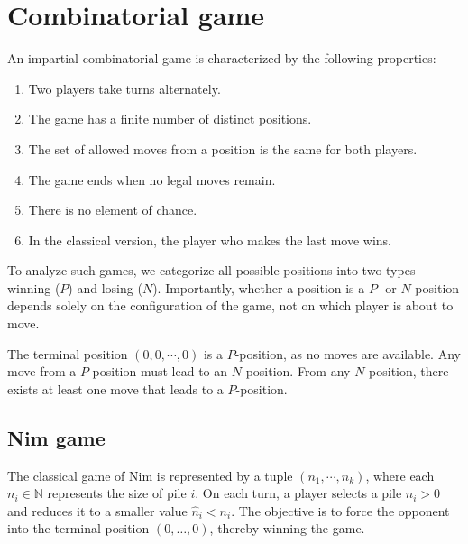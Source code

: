 \section{Combinatorial game}

\begin{definition}
    An impartial combinatorial game is characterized by the following properties:
    \begin{enumerate}
        \item Two players take turns alternately.
        \item The game has a finite number of distinct positions.
        \item The set of allowed moves from a position is the same for both players.
        \item The game ends when no legal moves remain.
        \item There is no element of chance.
        \item In the classical version, the player who makes the last move wins.
    \end{enumerate}
\end{definition}
\noindent To analyze such games, we categorize all possible positions into two types winning ($P$) and losing ($N$). 
Importantly, whether a position is a $P$- or $N$-position depends solely on the configuration of the game, not on which player is about to move.

The terminal position $(0, 0, \cdots, 0)$ is a $P$-position, as no moves are available.
Any move from a $P$-position must lead to an $N$-position. 
From any $N$-position, there exists at least one move that leads to a $P$-position. 

\subsection{Nim game}
The classical game of Nim is represented by a tuple $(n_1, \cdots, n_k)$, where each $n_i \in \mathbb{N}$ represents the size of pile $i$.
On each turn, a player selects a pile $n_i>0$ and reduces it to a smaller value $\hat{n}_i<n_i$. 
The objective is to force the opponent into the terminal position $(0, \dots, 0)$, thereby winning the game.

